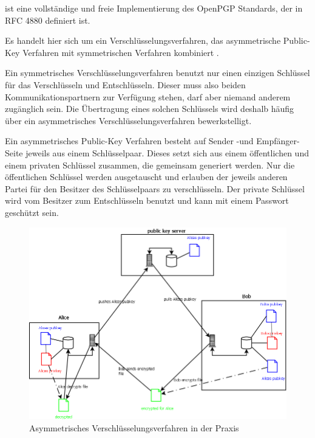  ist eine vollständige und freie Implementierung des OpenPGP Standards, der in RFC 4880  definiert ist.

Es handelt hier sich um ein Verschlüsselungsverfahren, das asymmetrische Public-Key Verfahren mit symmetrischen Verfahren kombiniert .

Ein symmetrisches Verschlüsselungsverfahren benutzt nur einen einzigen Schlüssel für das Verschlüsseln und Entschlüsseln. Dieser muss also beiden Kommunikationspartnern zur Verfügung stehen, darf aber niemand anderem zugänglich sein. Die Übertragung eines solchen Schlüssels wird deshalb häufig über ein asymmetrisches Verschlüsselungsverfahren bewerkstelligt.

Ein asymmetrisches Public-Key Verfahren besteht auf Sender -und Empfänger-Seite jeweils aus einem Schlüsselpaar. Dieses setzt sich aus einem öffentlichen und einem privaten Schlüssel zusammen, die gemeinsam generiert werden. Nur die öffentlichen Schlüssel werden ausgetauscht und erlauben der jeweils anderen Partei für den Besitzer des Schlüsselpaars zu verschlüsseln. Der private Schlüssel wird vom Besitzer zum Entschlüsseln benutzt und kann mit einem Passwort geschützt sein.

\begin{figure}[htb]
	\centering
	\includegraphics[scale=0.4]{Content/Problematik/BetrachtungDatenschutz/Verschluesselung/asymcrypto.png}
	\caption{Asymmetrisches Verschlüsselungsverfahren in der Praxis}
	\label{fig:asymcrypto}
\end{figure}

